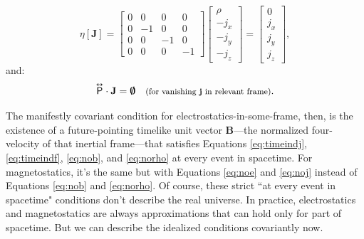 \documentclass[12pt]{article}
\renewcommand{\vv}[1]{\mathbf{#1}}
\newcommand{\capdy}[1]{ \overset{ \text{\tiny$\bm\leftrightarrow$} }{\vphantom{\text{\small{A}}}\smash{#1}} }
\begin{document}
\begin{equation*}
[\capdy{\mathsf{P}}] \eta [\vv J]
=
\begin{bmatrix}
0 & 0 & 0 & 0 \\
0 & -1 & 0 & 0 \\
0 & 0 & -1 & 0 \\
0 & 0 & 0 & -1
\end{bmatrix}
\begin{bmatrix}
\rho \\
- j_x \\
- j_y \\
- j_z
\end{bmatrix}
= 
\begin{bmatrix}
0 \\
j_x \\
j_y \\
j_z
\end{bmatrix},
\end{equation*}
and:
\begin{equation}\label{eq:norho}
\capdy{\mathsf{P}} \cdot \vv J = \textrm{\mbox{\boldmath $\emptyset$}}  \quad \text{\footnotesize{(for vanishing $\vv j$ in relevant frame)}} .
\end{equation}

The manifestly covariant condition for electrostatics-in-some-frame, then, is the existence of a future-pointing timelike unit vector $\vv B$---the normalized four-velocity of that inertial frame---that satisfies Equations \ref{eq:timeindj}, \ref{eq:timeindf}, \ref{eq:nob}, and \ref{eq:norho} at every event in spacetime. For magnetostatics, it's the same but with Equations \ref{eq:noe} and \ref{eq:noj} instead of Equations \ref{eq:nob} and \ref{eq:norho}. Of course, these strict ``at every event in spacetime" conditions don't describe the real universe. In practice, electrostatics and magnetostatics are always approximations that can hold only for part of spacetime. But we can describe the idealized conditions covariantly now.
\end{document}
